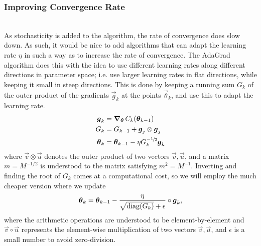    \subsubsection{Improving Convergence Rate}
        \\
        As stochasticity is added to the algorithm, the rate of convergence does slow down. As such, it would be nice to add algorithms that can adapt the learning rate $\eta$ in such a way as to increase the rate of convergence. The AdaGrad algorithm does this with the idea to use different learning rates along different directions in parameter space; i.e. use larger learning rates in flat directions, while keeping it small in steep directions. This is done by keeping a running sum $G_k$ of the outer product of the gradients $\vec{g}_k$ at the points $\vec{\theta}_k$, and use this to adapt the learning rate.
        \begin{align*}
            \boldsymbol{g}_k &= \operatorname{\operatorname{\boldsymbol{\nabla}}_{\boldsymbol{\theta}}} C_k(\boldsymbol{\theta}_{k-1}) \\
            G_k &= G_{k-1} + \boldsymbol{g}_j \otimes \boldsymbol{g}_j \\
            \boldsymbol{\theta}_k &= \boldsymbol{\theta}_{k-1} - \eta G_k^{-\sfrac{1}{2}} \boldsymbol{g}_k
        \end{align*}
        where $\vec{v} \otimes \vec{u}$ denotes the outer product of two vectors $\vec{v}, \vec{u}$, and a matrix $m = M^{-1/2}$ is understood to the matrix satisfying $m^2 = M^{-1}$. Inverting and finding the root of $G_k$ comes at a computational cost, so we will employ the much cheaper version where we update 
        \begin{align*}
            \boldsymbol{\theta}_{k} = \boldsymbol{\theta}_{k-1} - \frac{\eta}{\sqrt{\operatorname{diag}(G_k)}+\epsilon} \circ \boldsymbol{g}_k,
        \end{align*}
        where the arithmetic operations are understood to be element-by-element and $\vec{v}\circ \vec{u}$ represents the element-wise multiplication of two vectors $\vec{v}, \vec{u}$, and $\epsilon$ is a small number to avoid zero-division.
        \\


